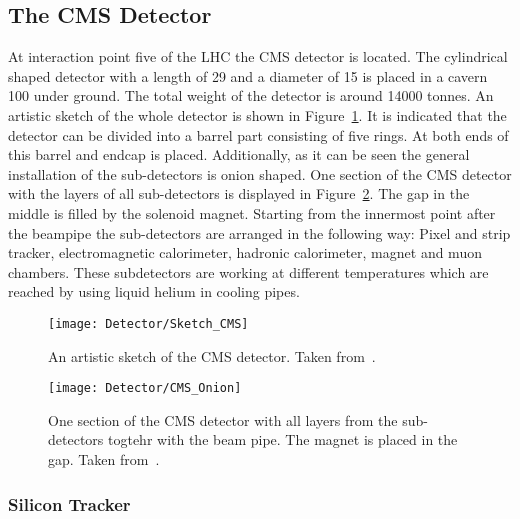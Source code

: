 \subsection{The CMS Detector \label{LHCCMSCMSDet}}

At interaction point five of the LHC the CMS detector is located. The cylindrical shaped detector with a length of 29\m{} and a diameter of 15\m{} is placed in a cavern 100\m{} under ground. The total weight of the detector is around 14000 tonnes. An artistic sketch of the whole detector is shown in Figure~\ref{plot:LHCCMSWholeCMS}. It is indicated that the detector can be divided into a barrel part consisting of five rings. At both ends of this barrel and endcap is placed. Additionally, as it can be seen the general installation of the sub-detectors is onion shaped. One section of the CMS detector with the layers of all sub-detectors is displayed in Figure~\ref{plot:LHCCMSOnionCMS}. The gap in the middle is filled by the solenoid magnet. Starting from the innermost point after the beampipe the sub-detectors are arranged in the following way: Pixel and strip tracker, electromagnetic calorimeter, hadronic calorimeter, magnet and muon chambers. These subdetectors are working at different temperatures which are reached by using liquid helium in cooling pipes.

\begin{figure}[!Hhtb]
  \centering
  \texttt{[image: Detector/Sketch\_CMS]}
  \caption[Artistic sketch of the CMS detector]{An artistic sketch of the CMS detector. Taken from~. \label{plot:LHCCMSWholeCMS}}
\end{figure}

\begin{figure}[!Hhtb]
  \centering
  \texttt{[image: Detector/CMS\_Onion]}
  \caption[One section of the CMS detector with all layers]{One section of the CMS detector with all layers from the sub-detectors togtehr with the beam pipe. The magnet is placed in the gap. Taken from~. \label{plot:LHCCMSOnionCMS}}
\end{figure}

\subsubsection{Silicon Tracker}

